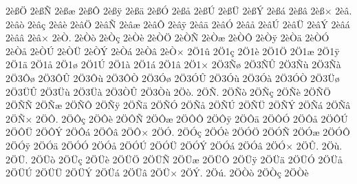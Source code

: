 {2^^e8^^df^^d6
2^^e8^^df^^d1
2^^e8^^df^^e6
2^^e8^^df^^d4
2^^e8^^df^^ff
2^^e8^^df^^e4
2^^e8^^df^^d3
2^^e8^^df^^e5
2^^e8^^df^^da
2^^e8^^df^^dc
2^^e8^^df^^dd
2^^e8^^df^^e1
2^^e8^^df^^e2
2^^e8^^df^^d7
2^^e8^^e2.
2^^e8^^e2^^f2
2^^e8^^e2^^e7
2^^e8^^e2^^e8
2^^e8^^e2^^d6
2^^e8^^e2^^d1
2^^e8^^e2^^e6
2^^e8^^e2^^d4
2^^e8^^e2^^ff
2^^e8^^e2^^e4
2^^e8^^e2^^d3
2^^e8^^e2^^e5
2^^e8^^e2^^da
2^^e8^^e2^^dc
2^^e8^^e2^^dd
2^^e8^^e2^^e1
2^^e8^^e2^^e2
2^^e8^^e2^^d7
2^^e8^^d2.
2^^e8^^d2^^f2
2^^e8^^d2^^e7
2^^e8^^d2^^e8
2^^e8^^d2^^d6
2^^e8^^d2^^d1
2^^e8^^d2^^e6
2^^e8^^d2^^d4
2^^e8^^d2^^ff
2^^e8^^d2^^e4
2^^e8^^d2^^d3
2^^e8^^d2^^e5
2^^e8^^d2^^da
2^^e8^^d2^^dc
2^^e8^^d2^^dd
2^^e8^^d2^^e1
2^^e8^^d2^^e2
2^^e8^^d2^^d7
2^^d61^^fb
2^^d61^^e7
2^^d61^^e8
2^^d61^^d6
2^^d61^^e6
2^^d61^^ff
2^^d61^^e4
2^^d61^^e5
2^^d61^^f8
2^^d61^^da
2^^d61^^e0
2^^d61^^e1
2^^d61^^e2
2^^d61^^d7
2^^d63^^d1^^f8
2^^d63^^d1^^db
2^^d63^^d1^^f9
2^^d63^^d1^^e0
2^^d63^^d4^^f8
2^^d63^^d4^^db
2^^d63^^d4^^f9
2^^d63^^d4^^d2
2^^d63^^d3^^f8
2^^d63^^d3^^db
2^^d63^^d3^^f9
2^^d63^^d3^^e0
2^^d63^^d3^^d2
2^^d63^^dc^^f8
2^^d63^^dc^^db
2^^d63^^dc^^f9
2^^d63^^dc^^e0
2^^d63^^d2^^db
2^^d63^^d2^^f9
2^^d6^^f2.
2^^d6^^d1.
2^^d6^^d1^^f2
2^^d6^^d1^^e7
2^^d6^^d1^^e8
2^^d6^^d1^^d6
2^^d6^^d1^^d1
2^^d6^^d1^^e6
2^^d6^^d1^^d4
2^^d6^^d1^^ff
2^^d6^^d1^^e4
2^^d6^^d1^^d3
2^^d6^^d1^^e5
2^^d6^^d1^^da
2^^d6^^d1^^dc
2^^d6^^d1^^dd
2^^d6^^d1^^e1
2^^d6^^d1^^e2
2^^d6^^d1^^d7
2^^d6^^d4.
2^^d6^^d4^^e7
2^^d6^^d4^^e8
2^^d6^^d4^^d1
2^^d6^^d4^^e6
2^^d6^^d4^^d4
2^^d6^^d4^^ff
2^^d6^^d4^^e4
2^^d6^^d4^^d3
2^^d6^^d4^^e5
2^^d6^^d4^^da
2^^d6^^d4^^dc
2^^d6^^d4^^dd
2^^d6^^d4^^e1
2^^d6^^d4^^e2
2^^d6^^d4^^d7
2^^d6^^d3.
2^^d6^^d3^^e7
2^^d6^^d3^^e8
2^^d6^^d3^^d6
2^^d6^^d3^^d1
2^^d6^^d3^^e6
2^^d6^^d3^^d4
2^^d6^^d3^^ff
2^^d6^^d3^^e4
2^^d6^^d3^^d3
2^^d6^^d3^^e5
2^^d6^^d3^^da
2^^d6^^d3^^dc
2^^d6^^d3^^dd
2^^d6^^d3^^e1
2^^d6^^d3^^e2
2^^d6^^d3^^d7
2^^d6^^db.
2^^d6^^f9.
2^^d6^^dc.
2^^d6^^dc^^f2
2^^d6^^dc^^e7
2^^d6^^dc^^e8
2^^d6^^dc^^d6
2^^d6^^dc^^d1
2^^d6^^dc^^e6
2^^d6^^dc^^d4
2^^d6^^dc^^ff
2^^d6^^dc^^e4
2^^d6^^dc^^d3
2^^d6^^dc^^e5
2^^d6^^dc^^da
2^^d6^^dc^^dc
2^^d6^^dc^^dd
2^^d6^^dc^^e1
2^^d6^^dc^^e2
2^^d6^^dc^^d7
2^^d6^^dd.
2^^d6^^fa.
2^^d6^^d2^^f2
2^^d6^^d2^^e7
2^^d6^^d2^^e8
}
